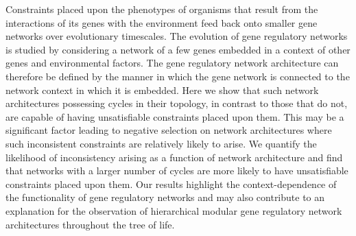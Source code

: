 Constraints placed upon the phenotypes of organisms that result from the interactions of its genes with the environment feed back onto smaller gene networks over evolutionary timescales. The evolution of gene regulatory networks is studied by considering a network of a few genes embedded in a context of other genes and environmental factors.  The gene regulatory network architecture can therefore be defined by the manner in which the gene network is connected to the network context in which it is embedded. Here we show that such network architectures possessing cycles in their topology, in contrast to those that do not, are capable of having unsatisfiable constraints placed upon them. This may be a significant factor leading to negative selection on network architectures where such inconsistent constraints are relatively likely to arise. We quantify the likelihood of inconsistency arising as a function of network architecture and find that networks with a larger number of cycles are more likely to have unsatisfiable constraints placed upon them. Our results highlight the context-dependence of the functionality of gene regulatory networks and may also contribute to an explanation for the observation of hierarchical modular gene regulatory network architectures throughout the tree of life.

